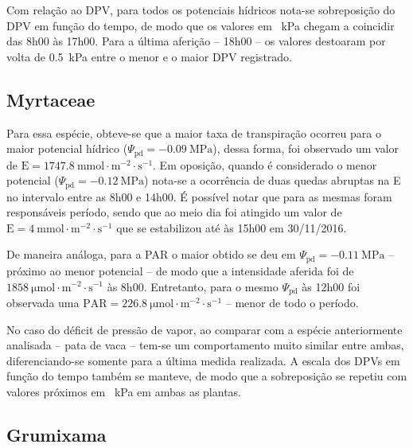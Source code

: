 \documentclass[a4paper, 12pt]{article}
\numberwithin{equation}{section}
\begin{document}
	Com relação ao DPV, para todos os potenciais hídricos nota-se sobreposição do DPV em função do tempo, de modo que os valores em \SI{}{\kilo\pascal} chegam a coincidir das 8h00 às 17h00. Para a última aferição -- 18h00 -- os valores destoaram por volta de \SI{0.5}{\kilo\pascal} entre o menor e o maior DPV registrado.
	
	\subsection{Myrtaceae}
	
	Para essa espécie, obteve-se que a maior taxa de transpiração ocorreu para o maior potencial hídrico ($\Psi_{\textrm{pd}}=\SI{-0.09}{\mega\pascal}$), dessa forma, foi observado um valor de $\textrm{E}=\SI{1747.8}{\milli\mole\cdot\meter^{-2}\cdot\second^{-1}}$. Em oposição, quando é considerado o menor potencial ($\Psi_{\textrm{pd}}=\SI{-0.12}{\mega\pascal}$) nota-se a ocorrência de duas quedas abruptas na E no intervalo entre as 8h00 e 14h00. É possível notar que para as mesmas foram responsáveis período, sendo que ao meio dia foi atingido um valor de $\textrm{E}=\SI{4}{\milli\mole\cdot\meter^{-2}\cdot\second^{-1}}$ que se estabilizou até às 15h00 em 30/11/2016.
	
	De maneira análoga, para a PAR o maior obtido se deu em $\Psi_{\textrm{pd}}=\SI{-0.11}{\mega\pascal}$ -- próximo ao menor potencial -- de modo que a intensidade aferida foi de $\SI{1858}{\micro\mole\cdot\meter^{-2}\cdot\second^{-1}}$ às 8h00. Entretanto, para o mesmo $\Psi_{\textrm{pd}}$ às 12h00 foi observada uma 
	$\textrm{PAR}=\SI{226.8}{\micro\mole\cdot\meter^{-2}\cdot\second^{-1}}$ -- menor de todo o período.	
	
	No caso do déficit de pressão de vapor, ao comparar com a espécie anteriormente analisada -- pata de vaca -- tem-se um comportamento muito similar entre ambas, diferenciando-se somente para a última medida realizada. A escala dos DPVs em função do tempo também se manteve, de modo que a sobreposição se repetiu com valores próximos em \SI{}{\kilo\pascal} em ambas as plantas.
	
	\subsection{Grumixama}
	
\end{document}
